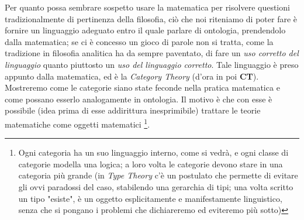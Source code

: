 \documentclass[a4paper, 11pt]{article}
\begin{document}
Per quanto possa sembrare sospetto usare la matematica per risolvere questioni tradizionalmente di pertinenza della filosofia, ciò che noi riteniamo di poter fare è fornire un linguaggio adeguato entro il quale parlare di ontologia, prendendolo dalla matematica; se ci è concesso un gioco di parole non si tratta, come la tradizione in filosofia analitica ha da sempre paventato, di fare un \emph{uso corretto del linguaggio} quanto piuttosto un \emph{uso del linguaggio corretto}. Tale linguaggio è preso appunto dalla matematica,  ed è la \emph{Category Theory} (d'ora in poi \textbf{CT}). Mostreremo come le categorie siano state feconde nella pratica matematica e come possano esserlo analogamente in ontologia. Il motivo è che con esse è possibile (idea prima di esse addirittura inesprimibile) trattare le teorie matematiche come oggetti matematici \footnote{Ogni categoria ha un suo linguaggio interno, come si vedrà, e ogni classe di categorie modella una logica; a loro volta le categorie devono stare in una categoria più grande (in \emph{Type Theory} c'è un postulato che permette di evitare gli ovvi paradossi del caso, stabilendo una gerarchia di tipi; una volta scritto un tipo "esiste", è un oggetto esplicitamente e manifestamente linguistico, senza che si pongano i problemi che dichiareremo ed eviteremo più sotto)}. 
\end{document}
